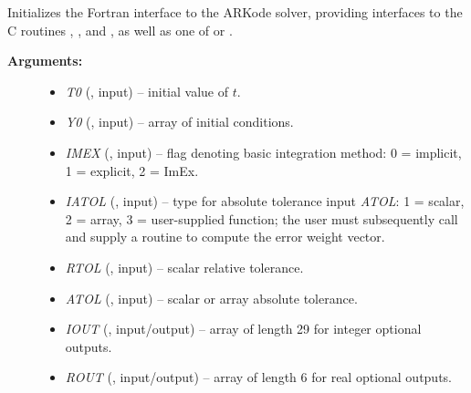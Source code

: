 \documentclass[letterpaper,10pt,english]{sphinxmanual}
\begin{document}
\begin{fulllineitems}
\label{f_interface/Usage:f/_/FARKMALLOC}
Initializes the Fortran interface to the ARKode solver, providing
interfaces to the C routines {\hyperref[c_interface/User_callable:c.ARKodeCreate]{\emph{}}},
{\hyperref[c_interface/User_callable:c.ARKodeSetUserData]{\emph{}}}, and {\hyperref[c_interface/User_callable:c.ARKodeInit]{\emph{}}}, as well
as one of {\hyperref[c_interface/User_callable:c.ARKodeSStolerances]{\emph{}}} or
{\hyperref[c_interface/User_callable:c.ARKodeSVtolerances]{\emph{}}}.
\begin{description}
\item[{\textbf{Arguments:}}] \leavevmode\begin{itemize}
\item {} 
\emph{T0} (, input) -- initial value of \(t\).

\item {} 
\emph{Y0} (, input) -- array of initial conditions.

\item {} 
\emph{IMEX} (, input) -- flag denoting basic integration
method: 0 = implicit, 1 = explicit, 2 = ImEx.

\item {} 
\emph{IATOL} (, input) -- type for absolute tolerance input
\emph{ATOL}: 1 = scalar, 2 = array, 3 = user-supplied function; the
user must subsequently call {\hyperref[f_interface/Usage:f/_/FARKEWTSET]{\emph{}}} and supply
a routine {\hyperref[f_interface/Usage:f/_/FARKEWT]{\emph{}}} to compute the error weight vector.

\item {} 
\emph{RTOL} (, input) -- scalar relative tolerance.

\item {} 
\emph{ATOL} (, input) -- scalar or array absolute tolerance.

\item {} 
\emph{IOUT} (, input/output) -- array of length 29 for integer optional outputs.

\item {} 
\emph{ROUT} (, input/output) -- array of length 6 for real optional outputs.


\end{itemize}
\end{description}
\end{fulllineitems}
\end{document}
